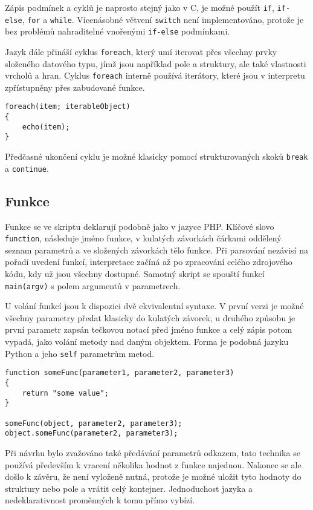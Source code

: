 \documentclass[11pt,twoside,a4paper]{book}
\begin{document}
Zápis podmínek a cyklů je naprosto stejný jako v C, je možné použít \texttt{if}, \texttt{if-else}, \texttt{for} a \texttt{while}. Vícenásobné větvení \texttt{switch} není implementováno, protože je bez problémů nahraditelné vnořenými \texttt{if-else} podmínkami.

Jazyk dále přináší cyklus \texttt{foreach}, který umí iterovat přes všechny prvky složeného datového typu, jímž jsou například pole a struktury, ale také vlastnosti vrcholů a hran. Cyklus \texttt{foreach} interně používá iterátory, které jsou v interpretu zpřístupněny přes zabudované funkce.

\begin{verbatim}
foreach(item; iterableObject)
{
    echo(item);
}
\end{verbatim}

Předčasné ukončení cyklu je možné klasicky pomocí strukturovaných skoků \texttt{break} a \texttt{continue}.


\subsection{Funkce}

Funkce se ve skriptu deklarují podobně jako v jazyce PHP. Klíčové slovo \texttt{function}, následuje jméno funkce, v kulatých závorkách čárkami oddělený seznam parametrů a ve složených závorkách tělo funkce. Při parsování nezávisí na pořadí uvedení funkcí, interpretace začíná až po zpracování celého zdrojového kódu, kdy už jsou všechny dostupné. Samotný skript se spouští funkcí \texttt{main(argv)} s polem argumentů v parametrech.

U volání funkcí jsou k dispozici dvě ekvivalentní syntaxe. V první verzi je možné všechny parametry předat klasicky do kulatých závorek, u druhého způsobu je první parametr zapsán tečkovou notací před jméno funkce a celý zápis potom vypadá, jako volání metody nad daným objektem. Forma je podobná jazyku Python a jeho \texttt{self} parametrům metod.

\begin{verbatim}
function someFunc(parameter1, parameter2, parameter3)
{
    return "some value";
}

someFunc(object, parameter2, parameter3);
object.someFunc(parameter2, parameter3);
\end{verbatim}

Při návrhu bylo zvažováno také předávání parametrů odkazem, tato technika se používá především k vracení několika hodnot z funkce najednou. Nakonec se ale došlo k závěru, že není vyloženě nutná, protože je možné uložit tyto hodnoty do struktury nebo pole a vrátit celý kontejner. Jednoduchost jazyka a nedeklarativnost proměnných k tomu přímo vybízí.
\end{document}
